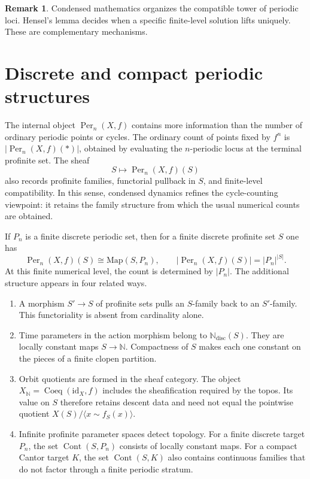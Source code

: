 \documentclass[10pt]{amsart}
\newcommand{\Coeq}{\operatorname{Coeq}}
\newcommand{\Cont}{\operatorname{Cont}}
\newcommand{\Per}{\operatorname{Per}}
\newcommand{\N}{\mathbb{N}}
\newcommand{\Ndisc}{\mathbb{N}_{\mathrm{disc}}}
\theoremstyle{plain}
\theoremstyle{definition}
\newtheorem{remark}[theorem]{Remark}
\begin{document}
\begin{remark}
Condensed mathematics organizes the compatible tower of periodic loci.
Hensel's lemma decides when a specific finite-level solution lifts uniquely.
These are complementary mechanisms.
\end{remark}

\section{Discrete and compact periodic structures}
\label{sec:not-counting}

The internal object $\Per_n(X,f)$ contains more information than the number of
ordinary periodic points or cycles. The ordinary count of points fixed by
$f^n$ is $|\Per_n(X,f)(*)|$, obtained by evaluating the $n$-periodic locus at
the terminal profinite set. The sheaf
\[
  S\longmapsto \Per_n(X,f)(S)
\]
also records profinite families, functorial pullback in $S$, and finite-level
compatibility. In this sense, condensed dynamics refines the cycle-counting
viewpoint: it retains the family structure from which the usual numerical
counts are obtained.

If $P_n$ is a finite discrete periodic set, then for a finite discrete profinite set
$S$ one has
\[
  \Per_n(X,f)(S)\cong\mathrm{Map}(S,P_n),
  \qquad
  |\Per_n(X,f)(S)|=|P_n|^{|S|}.
\]
At this finite numerical level, the count is determined by $|P_n|$. The
additional structure appears in four related ways.

\begin{enumerate}[label=(\roman*)]
\item A morphism $S'\to S$ of profinite sets pulls an $S$-family back to an
$S'$-family. This functoriality is absent from cardinality alone.

\item Time parameters in the action morphism belong to $\Ndisc(S)$. They are
locally constant maps $S\to\N$. Compactness of $S$ makes each one constant on
the pieces of a finite clopen partition.

\item Orbit quotients are formed in the sheaf category. The object
$X_{\N}=\Coeq(\mathrm{id}_X,f)$ includes the sheafification required by the
topos. Its value on $S$ therefore retains descent data and need not equal the
pointwise quotient $X(S)/\langle x\sim f_S(x)\rangle$.

\item Infinite profinite parameter spaces detect topology. For a finite
discrete target $P_n$, the set $\Cont(S,P_n)$ consists of locally constant maps.
For a compact Cantor target $K$, the set $\Cont(S,K)$ also contains continuous
families that do not factor through a finite periodic stratum.
\end{enumerate}
\end{document}
